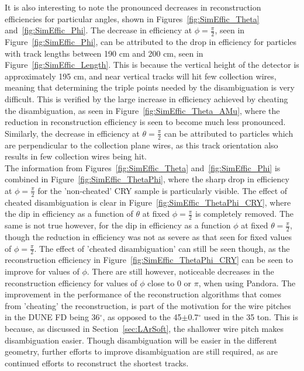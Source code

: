 It is also interesting to note the pronounced decreases in reconstruction efficiencies for particular angles, shown in Figures~\ref{fig:SimEffic_Theta} and~\ref{fig:SimEffic_Phi}. The decrease in efficiency at $\phi = \frac{\pi}{2}$, seen in Figure~\ref{fig:SimEffic_Phi}, can be attributed to the drop in efficiency for particles with track lengths between 190 cm and 200 cm, seen in Figure~\ref{fig:SimEffic_Length}. This is because the vertical height of the detector is approximately 195 cm, and near vertical tracks will hit few collection wires, meaning that determining the triple points needed by the disambiguation is very difficult. This is verified by the large increase in efficiency achieved by cheating the disambiguation, as seen in Figure~\ref{fig:SimEffic_Theta_AMu}, where the reduction in reconstruction efficiency is seen to become much less pronounced. Similarly, the decrease in efficiency at $\theta = \frac{\pi}{2}$ can be attributed to particles which are perpendicular to the collection plane wires, as this track orientation also results in few collection wires being hit. \\  

The information from Figures~\ref{fig:SimEffic_Theta} and~\ref{fig:SimEffic_Phi} is combined in Figure~\ref{fig:SimEffic_ThetaPhi}, where the sharp drop in efficiency at $\phi = \frac{\pi}{2}$ for the 'non-cheated' CRY sample is particularly visible. The effect of cheated disambiguation is clear in Figure~\ref{fig:SimEffic_ThetaPhi_CRY}, where the dip in efficiency as a function of $\theta$ at fixed $\phi=\frac{\pi}{2}$ is completely removed. The same is not true however, for the dip in efficiency as a function $\phi$ at fixed $\theta = \frac{\pi}{2}$, though the reduction in efficiency was not as severe as that seen for fixed values of $\phi = \frac{\pi}{2}$. The effect of 'cheated disambiguation' can still be seen though, as the reconstruction efficiency in Figure~\ref{fig:SimEffic_ThetaPhi_CRY} can be seen to improve for values of $\phi$. There are still however, noticeable decreases in the reconstruction efficiency for values of $\phi$ close to 0 or $\pi$, when using Pandora. The improvement in the performance of the reconstruction algorithms that comes from 'cheating' the reconstruction, is part of the motivation for the wire pitches in the DUNE FD being 36$^{\circ}$, as opposed to the 45$\pm$0.7$^{\circ}$ used in the 35 ton. This is because, as discussed in Section~\ref{sec:LArSoft}, the shallower wire pitch makes disambiguation easier. Though disambiguation will be easier in the different geometry, further efforts to improve disambiguation are still required, as are continued efforts to reconstruct the shortest tracks. \\

